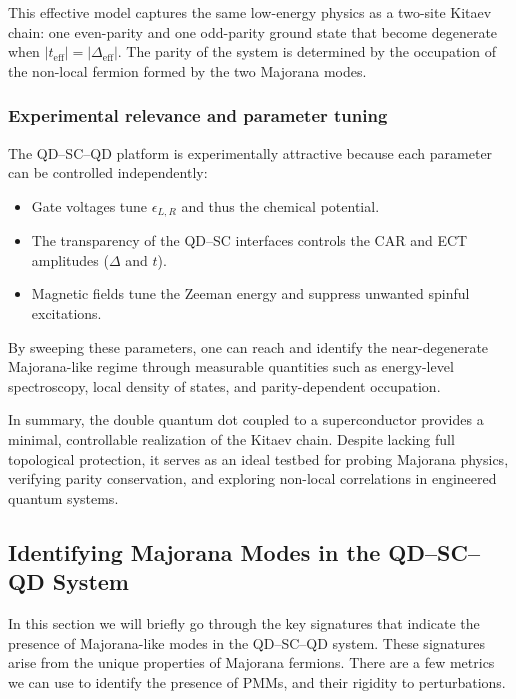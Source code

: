 \documentclass[11pt, letterpaper, titlepage]{article}
\begin{document}
This effective model captures the same low-energy physics as a two-site Kitaev chain: one even-parity and one odd-parity ground state that become degenerate when $|t_{\mathrm{eff}}| = |\Delta_{\mathrm{eff}}|$. The parity of the system is determined by the occupation of the non-local fermion formed by the two Majorana modes.

\subsubsection{Experimental relevance and parameter tuning}

The QD–SC–QD platform is experimentally attractive because each parameter can be controlled independently:
\begin{itemize}
    \item Gate voltages tune $\epsilon_{L,R}$ and thus the chemical potential.
    \item The transparency of the QD–SC interfaces controls the CAR and ECT amplitudes ($\Delta$ and $t$).
    \item Magnetic fields tune the Zeeman energy and suppress unwanted spinful excitations.
\end{itemize}
By sweeping these parameters, one can reach and identify the near-degenerate Majorana-like regime through measurable quantities such as energy-level spectroscopy, local density of states, and parity-dependent occupation.

In summary, the double quantum dot coupled to a superconductor provides a minimal, controllable realization of the Kitaev chain. Despite lacking full topological protection, it serves as an ideal testbed for probing Majorana physics, verifying parity conservation, and exploring non-local correlations in engineered quantum systems.

\subsection{Identifying Majorana Modes in the QD–SC–QD System}
In this section we will briefly go through the key signatures that indicate the presence of Majorana-like modes in the QD–SC–QD system. These signatures arise from the unique properties of Majorana fermions. There are a few metrics we can use to identify the presence of PMMs, and their rigidity to perturbations.\\
\end{document}
